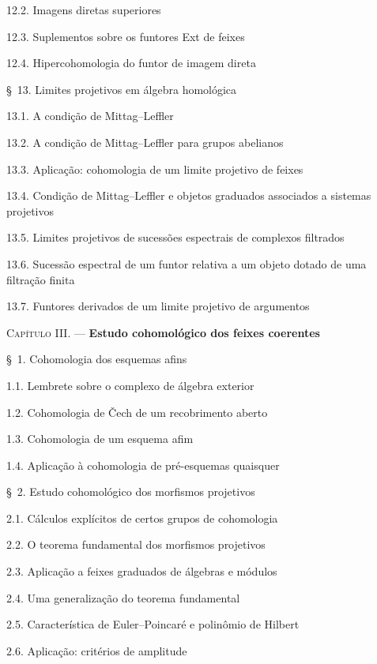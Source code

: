 \begin{flushleft}
12.2. Imagens diretas superiores 

12.3. Suplementos sobre os funtores Ext de feixes 

12.4. Hipercohomologia do funtor de imagem direta 


\S~13. Limites projetivos em álgebra homológica 

13.1. A condição de Mittag--Leffler 

13.2. A condição de Mittag--Leffler para grupos abelianos 

13.3. Aplicação: cohomologia de um limite projetivo de feixes 

13.4. Condição de Mittag--Leffler e objetos graduados associados a sistemas
projetivos 

13.5. Limites projetivos de sucessões espectrais de complexos filtrados

13.6. Sucessão espectral de um funtor relativa a um objeto dotado de uma
filtração finita 

13.7. Funtores derivados de um limite projetivo de argumentos 

\medskip
\textsc{Capítulo III.} --- \textbf{Estudo cohomológico dos feixes coerentes}

\medskip
\S~1. Cohomologia dos esquemas afins 

1.1. Lembrete sobre o complexo de álgebra exterior 

1.2. Cohomologia de \v Cech de um recobrimento aberto 

1.3. Cohomologia de um esquema afim 

1.4. Aplicação à cohomologia de pré-esquemas quaisquer 

\medskip
\S~2. Estudo cohomológico dos morfismos projetivos 

2.1. Cálculos explícitos de certos grupos de cohomologia 

2.2. O teorema fundamental dos morfismos projetivos 

2.3. Aplicação a feixes graduados de álgebras e módulos 

2.4. Uma generalização do teorema fundamental 

2.5. Característica de Euler--Poincaré e polinômio de Hilbert 

2.6. Aplicação: critérios de amplitude 


\end{flushleft}
